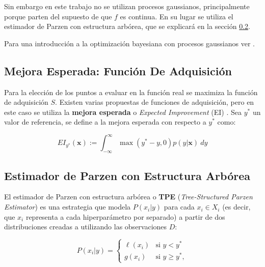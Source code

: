 Sin embargo en este trabajo no se utilizan procesos gaussianos, principalmente porque parten del supuesto de que $f$ es continua. En su lugar se utiliza el estimador de Parzen con estructura arbórea, que se explicará en la sección \ref{sec:TPE}.

Para una introducción a la optimización bayesiana con procesos gaussianos ver \cite{https://doi.org/10.48550/arxiv.1012.2599}.

\subsection{Mejora Esperada: Función De Adquisición} 
 
Para la elección de los puntos a evaluar en la función real se maximiza la función de adquisición $S$. Existen varias propuestas de funciones de adquisición, pero en este caso se utiliza la \textbf{mejora esperada} o \textit{Expected Improvement} (EI) \cite{EI1}. Sea $y^*$ un valor de referencia, se define a la mejora esperada  con respecto a $y^*$ como:


\begin{equation}
\label{eq:ei_def}
EI_{y^*}(\textbf{x}) := \int_{-\infty}^{\infty} \max(y^*-y,0) p(y|\textbf{x}) \ dy
\end{equation}
 

\subsection{Estimador de Parzen con Estructura Arbórea} 
\label{sec:TPE}

 El estimador de Parzen con estructura arbórea o \textbf{TPE} (\textit{Tree-Structured Parzen Estimator}) \cite{NIPS2011_86e8f7ab} es una estrategia que modela $P(x_i|y)$ para cada $x_i \in X_i$ (es decir, que $x_i$ representa a cada hiperparámetro por separado) a partir de dos distribuciones creadas a utilizando las observaciones $D$:

\begin{equation}
\label{eq:tpe}
P(x_i|y) =
	\begin{cases}
		\ell (x_i) & \text{si } y <y^{*} \\
		g(x_i) & \text{si } y \geq y^{*},
	\end{cases}
\end{equation}


